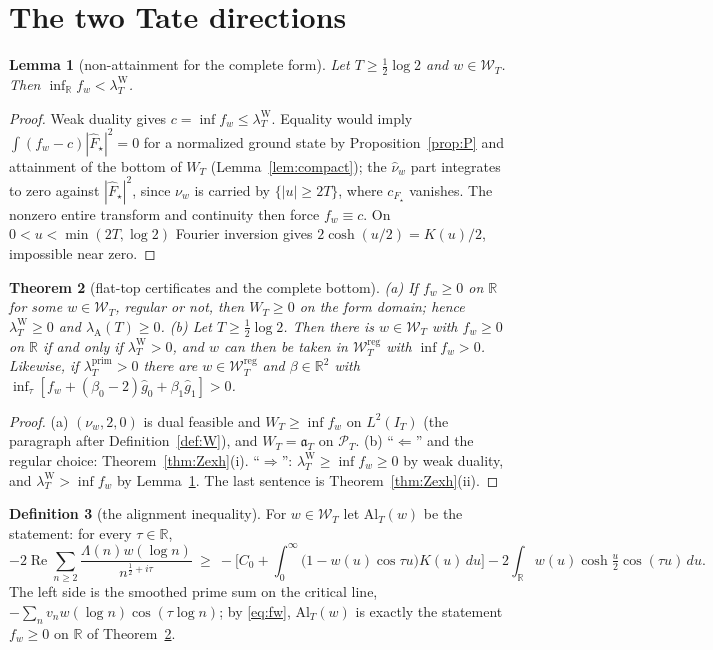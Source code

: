 \documentclass[10pt]{amsart}
\newtheorem{theorem}{Theorem}[section]
\newtheorem{lemma}[theorem]{Lemma}
\theoremstyle{definition}
\newtheorem{definition}[theorem]{Definition}
\theoremstyle{remark}
\newcommand{\R}{\mathbb R}
\newcommand{\Rel}{\operatorname{Re}}
\newcommand{\PT}{\mathcal P_T}
\newcommand{\IT}{I_T}
\newcommand{\lamP}{\lambda^{\mathrm{prim}}_T}
\newcommand{\lamW}{\lambda^{\mathrm W}_T}
\newcommand{\lamA}{\lambda_{\mathrm A}(T)}
\newcommand{\gh}[1]{\widehat g_{#1}}
\newcommand{\nuh}{\widehat\nu}
\newcommand{\Fh}{\widehat F}
\newcommand{\Wcl}{\mathcal W_T}
\begin{document}
\section{The two Tate directions}\label{sec:complete}

\begin{lemma}[non-attainment for the complete form]\label{lem:Onat}
Let $T\ge\frac12\log2$ and $w\in\Wcl$. Then $\inf_\R f_w<\lamW$.
\end{lemma}
\begin{proof}
Weak duality gives $c=\inf f_w\le\lamW$. Equality would imply
$\int(f_w-c)|\Fh_\star|^2=0$ for a normalized ground state
by Proposition~\ref{prop:P} and attainment of the bottom of $W_T$ (Lemma~\ref{lem:compact}); the $\nuh_w$
part integrates to zero against $|\Fh_\star|^2$, since $\nu_w$ is carried by $\{|u|\ge2T\}$, where $c_{F_\star}$
vanishes.
The nonzero entire transform and continuity then force $f_w\equiv c$.
On $0<u<\min(2T,\log2)$ Fourier inversion gives
$2\cosh(u/2)=K(u)/2$, impossible near zero.
\end{proof}

\begin{theorem}[flat-top certificates and the complete bottom]\label{thm:Al}
\emph{(a)} If $f_w\ge0$ on $\R$ for some $w\in\Wcl$, regular or not, then $W_T\ge0$ on the form domain;
hence $\lamW\ge0$ and $\lamA\ge0$.
\emph{(b)} Let $T\ge\frac12\log2$. Then there is $w\in\Wcl$ with $f_w\ge0$ on $\R$ if and only if
$\lamW>0$, and $w$ can then be taken in $\Wcl^{\mathrm{reg}}$ with $\inf f_w>0$. Likewise, if $\lamP>0$
there are $w\in\Wcl^{\mathrm{reg}}$ and $\beta\in\R^2$ with $\inf_\tau[f_w+(\beta_0-2)\gh0+\beta_1\gh1]>0$.
\end{theorem}
\begin{proof}
(a) $(\nu_w,2,0)$ is dual feasible and $W_T\ge\inf f_w$ on $L^2(\IT)$ (the paragraph after
Definition~\ref{def:W}), and $W_T=\mathfrak a_T$ on $\PT$. (b) ``$\Leftarrow$'' and the regular choice:
Theorem~\ref{thm:Zexh}(i). ``$\Rightarrow$'': $\lamW\ge\inf f_w\ge0$ by weak duality, and $\lamW>\inf f_w$ by
Lemma~\ref{lem:Onat}. The last sentence is Theorem~\ref{thm:Zexh}(ii).
\end{proof}

\begin{definition}[the alignment inequality]\label{def:Al}
For $w\in\Wcl$ let $\mathrm{Al}_T(w)$ be the statement: for every $\tau\in\R$,
\[
-2\Rel\sum_{n\ge2}\frac{\Lambda(n)w(\log n)}{n^{\frac12+i\tau}}\ \ge\
-\Big[C_0+\int_0^\infty\big(1-w(u)\cos\tau u\big)K(u)\,du\Big]-2\int_\R w(u)\cosh\tfrac u2\cos(\tau u)\,du .
\]
The left side is the smoothed prime sum on the critical line, $-\sum_nv_nw(\log n)\cos(\tau\log n)$; by
\eqref{eq:fw}, $\mathrm{Al}_T(w)$ is exactly the statement $f_w\ge0$ on $\R$ of Theorem~\ref{thm:Al}.
\end{definition}
\end{document}

